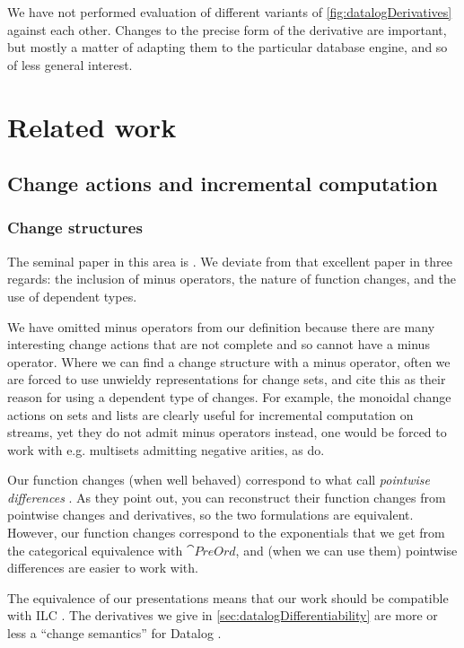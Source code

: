 We have not performed evaluation of different variants of
\cref{fig:datalogDerivatives} against each other. Changes to the precise form of
the derivative are important, but mostly a matter of adapting them to the
particular database engine, and so of less general interest.

\section{Related work}

\subsection{Change actions and incremental computation}

\subsubsection{Change structures}
\label{sec:relatedChangeStructures}

The seminal paper in this area is \textcite{cai2014changes}. We deviate from
that excellent paper in three regards: the
inclusion of minus operators, the nature of function changes, and the use of
dependent types.

We have omitted minus operators from our definition because
there are many interesting change actions that are not complete and so cannot
have a minus operator. Where we can find a change structure with a minus operator, often we are
forced to use unwieldy representations for change sets, and
\citeauthor{cai2014changes} cite this as their reason for using a dependent
type of changes. For example, the monoidal change actions on sets and lists are clearly
useful for incremental computation on streams, yet they do not admit minus
operators \textemdash{} instead, one would
be forced to work with e.g. multisets admitting negative arities, as \citeauthor{cai2014changes} do.

Our function changes (when well behaved) correspond to what \citeauthor{cai2014changes} call
\emph{pointwise differences} \autocite[see][section 2.2]{cai2014changes}. As
they point out, you can reconstruct their
function changes from pointwise changes and derivatives, so the two formulations
are equivalent. However, our function changes correspond to the
exponentials that we get from the categorical equivalence with $\cat{PreOrd}$,
and (when we can use them) pointwise differences are easier to work with.

The equivalence of our presentations means that our work should be compatible
with ILC \autocite[see][section 3]{cai2014changes}. The derivatives we give in \cref{sec:datalogDifferentiability} are more or
less a ``change semantics'' for Datalog \autocite[see][section
3.5]{cai2014changes}. 

